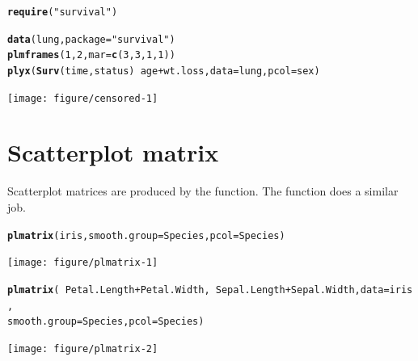 \documentclass[11pt]{article}\usepackage[]{graphicx}\usepackage[]{color}
\makeatletter
\newcommand{\hlnum}[1]{\textcolor[rgb]{0.686,0.059,0.569}{#1}}%
\newcommand{\hlstr}[1]{\textcolor[rgb]{0.192,0.494,0.8}{#1}}%
\newcommand{\hlopt}[1]{\textcolor[rgb]{0,0,0}{#1}}%
\newcommand{\hlstd}[1]{\textcolor[rgb]{0.345,0.345,0.345}{#1}}%
\newcommand{\hlkwc}[1]{\textcolor[rgb]{0.333,0.667,0.333}{#1}}%
\newcommand{\hlkwd}[1]{\textcolor[rgb]{0.737,0.353,0.396}{\textbf{#1}}}%
\newenvironment{kframe}{%
 \def\at@end@of@kframe{}%
 \ifinner\ifhmode%
  \def\at@end@of@kframe{\end{minipage}}%
  \begin{minipage}{\columnwidth}%
 \fi\fi%
 \def\FrameCommand##1{\hskip\@totalleftmargin \hskip-\fboxsep
 \colorbox{shadecolor}{##1}\hskip-\fboxsep
     \hskip-\linewidth \hskip-\@totalleftmargin \hskip\columnwidth}%
 \MakeFramed {\advance\hsize-\width
   \@totalleftmargin\z@ \linewidth\hsize
   \@setminipage}}%
 {\par\unskip\endMakeFramed%
 \at@end@of@kframe}
\newenvironment{knitrout}{}{} %
\makeatother
\begin{document}
\begin{knitrout}
\color{fgcolor}\begin{kframe}
\begin{alltt}
\hlkwd{require}\hlstd{(}\hlstr{"survival"}\hlstd{)}
\end{alltt}


{\ttfamily\noindent\itshape\color{messagecolor}{\#\# Loading required package: survival}}\begin{alltt}
\hlkwd{data}\hlstd{(lung,} \hlkwc{package}\hlstd{=}\hlstr{"survival"}\hlstd{)}
\hlkwd{plmframes}\hlstd{(}\hlnum{1}\hlstd{,}\hlnum{2}\hlstd{,}\hlkwc{mar}\hlstd{=}\hlkwd{c}\hlstd{(}\hlnum{3}\hlstd{,}\hlnum{3}\hlstd{,}\hlnum{1}\hlstd{,}\hlnum{1}\hlstd{))}
\hlkwd{plyx}\hlstd{(}\hlkwd{Surv}\hlstd{(time,status)} \hlopt{~} \hlstd{age}\hlopt{+}\hlstd{wt.loss,} \hlkwc{data}\hlstd{=lung,} \hlkwc{pcol}\hlstd{=sex)}
\end{alltt}
\end{kframe}
\texttt{[image: figure/censored-1]} 

\end{knitrout}


\section{Scatterplot matrix}
Scatterplot matrices are produced by the  function.
The function  does a similar job.

\begin{knitrout}
\color{fgcolor}\begin{kframe}
\begin{alltt}
\hlkwd{plmatrix}\hlstd{(iris,} \hlkwc{smooth.group}\hlstd{=Species,} \hlkwc{pcol}\hlstd{=Species)}
\end{alltt}
\end{kframe}
\texttt{[image: figure/plmatrix-1]} 
\begin{kframe}\begin{alltt}
\hlkwd{plmatrix}\hlstd{(}\hlopt{~}\hlstd{Petal.Length}\hlopt{+}\hlstd{Petal.Width,} \hlopt{~}\hlstd{Sepal.Length}\hlopt{+}\hlstd{Sepal.Width,} \hlkwc{data}\hlstd{=iris,}
         \hlkwc{smooth.group}\hlstd{=Species,} \hlkwc{pcol}\hlstd{=Species)}
\end{alltt}
\end{kframe}
\texttt{[image: figure/plmatrix-2]} 

\end{knitrout}
\end{document}
